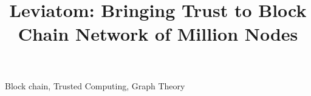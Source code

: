 \documentclass[10pt, conference, compsocconf]{IEEEtran}
\begin{document}
\title{Leviatom: Bringing Trust to Block Chain Network of Million Nodes}



\maketitle






\begin{IEEEkeywords}
Block chain, Trusted Computing, Graph Theory 

\end{IEEEkeywords}


\IEEEpeerreviewmaketitle






\balance


\end{document}

